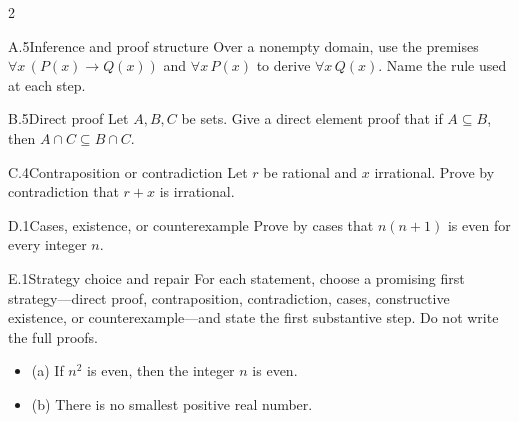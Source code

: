 \documentclass[9pt]{extarticle}
\begin{document}
\begin{multicols}{2}
\begin{CoreProblem}{A.5}{Inference and proof structure}
Over a nonempty domain, use the premises
$\forall x\,(P(x)\to Q(x))$ and $\forall x\,P(x)$ to derive
$\forall x\,Q(x)$. Name the rule used at each step.
\end{CoreProblem}
\begin{CoreProblem}{B.5}{Direct proof}
Let $A,B,C$ be sets. Give a direct element proof that if $A\subseteq B$, then
$A\cap C\subseteq B\cap C$.
\end{CoreProblem}
\begin{CoreProblem}{C.4}{Contraposition or contradiction}
Let $r$ be rational and $x$ irrational. Prove by contradiction that $r+x$ is irrational.
\end{CoreProblem}
\columnbreak
\begin{CoreProblem}{D.1}{Cases, existence, or counterexample}
Prove by cases that $n(n+1)$ is even for every integer $n$.
\end{CoreProblem}
\begin{CoreProblem}{E.1}{Strategy choice and repair}
For each statement, choose a promising first strategy---direct proof,
contraposition, contradiction, cases, constructive existence, or
counterexample---and state the first substantive step. Do not write the full
proofs.
\begin{itemize}
  \item (a) If $n^2$ is even, then the integer $n$ is even.
  \item (b) There is no smallest positive real number.
\end{itemize}
\end{CoreProblem}
\end{multicols}
\CoreWorkArea
\FormBreak
{}
\end{document}
